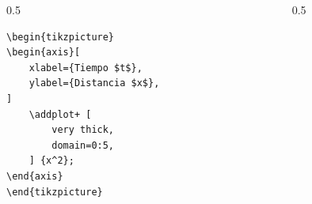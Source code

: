 \documentclass[12pt,aspectratio=169,ignorenonframetext]{ltxbeamer}
\begin{document}
\begin{frame}[fragile]
\bigskip

\begin{columns}
    \begin{column}{0.5\textwidth}
        \begin{verbatim}
\begin{tikzpicture}
\begin{axis}[
    xlabel={Tiempo $t$},
    ylabel={Distancia $x$},
]
    \addplot+ [
        very thick,
        domain=0:5,
    ] {x^2};
\end{axis}
\end{tikzpicture}
        \end{verbatim}
    \end{column}
    {\color{gray} \vline}
    \begin{column}{0.5\textwidth}
        \lmr
    \end{column}
\end{columns}
\end{frame}
\end{document}
